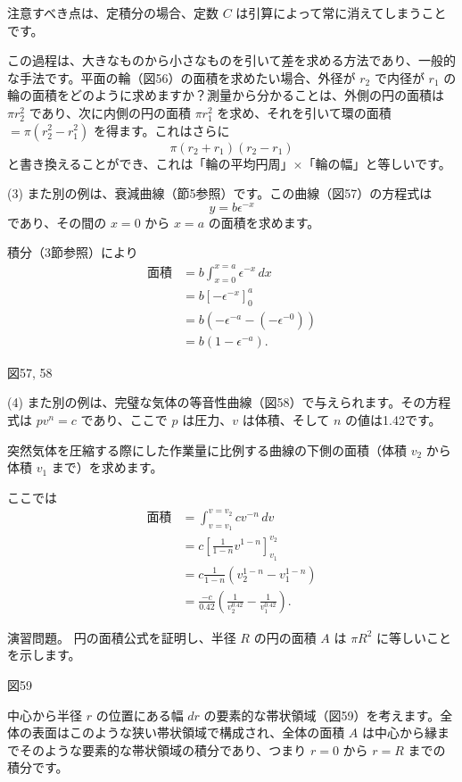 \documentclass[a4paper,11pt,openany]{ltjsbook}
\begin{document}
注意すべき点は、定積分の場合、定数 $C$ は引算によって常に消えてしまうことです。

この過程は、大きなものから小さなものを引いて差を求める方法であり、一般的な手法です。平面の輪（図56）の面積を求めたい場合、外径が \(r_2\) で内径が \(r_1\) の輪の面積をどのように求めますか？測量から分かることは、外側の円の面積は \(\pi r_2^2\) であり、次に内側の円の面積 \(\pi r_1^2\) を求め、それを引いて環の面積 \(= \pi(r_2^2 - r_1^2)\) を得ます。これはさらに
\[
\pi(r_2 + r_1)(r_2 - r_1)
\]
と書き換えることができ、これは「輪の平均円周」$\times$「輪の幅」と等しいです。

(3) また別の例は、衰減曲線（節5参照）です。この曲線（図57）の方程式は
\[
y = b \epsilon^{-x}
\]
であり、その間の \(x = 0\) から \(x = a\) の面積を求めます。

積分（3節参照）により
\begin{align*}
\text{面積} &= b \int_{x=0}^{x=a} \epsilon^{-x} \, dx \\
&= b \left[ -\epsilon^{-x} \right]_0^a \\
&= b \left( -\epsilon^{-a} - (-\epsilon^{-0}) \right) \\
&= b (1 - \epsilon^{-a}).
\end{align*}

図57, 58

(4) また別の例は、完璧な気体の等音性曲線（図58）で与えられます。その方程式は \(p v^n = c\) であり、ここで \(p\) は圧力、\(v\) は体積、そして \(n\) の値は1.42です。

突然気体を圧縮する際にした作業量に比例する曲線の下側の面積（体積 \(v_2\) から体積 \(v_1\) まで）を求めます。

ここでは
\begin{align*}
\text{面積} &= \int_{v=v_1}^{v=v_2} c v^{-n} \, dv \\
&= c \left[ \frac{1}{1-n} v^{1-n} \right]_{v_1}^{v_2} \\
&= c \frac{1}{1-n} (v_2^{1-n} - v_1^{1-n}) \\
&= \frac{-c}{0.42} \left( \frac{1}{v_2^{0.42}} - \frac{1}{v_1^{0.42}} \right).
\end{align*}

演習問題。
円の面積公式を証明し、半径 \(R\) の円の面積 \(A\) は \(\pi R^2\) に等しいことを示します。

図59

中心から半径 \(r\) の位置にある幅 \(dr\) の要素的な帯状領域（図59）を考えます。全体の表面はこのような狭い帯状領域で構成され、全体の面積 \(A\) は中心から縁までそのような要素的な帯状領域の積分であり、つまり \(r = 0\) から \(r = R\) までの積分です。
\end{document}

